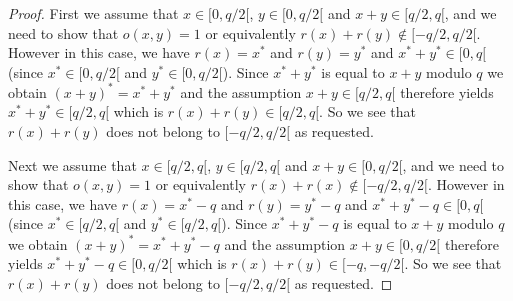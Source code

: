 \documentclass{article}
\begin{document}
\begin{proof}
  First we assume that $x\in[0,q/2[$, $y\in[0,q/2[$ and $x+y\in[q/2,q[$, and 
  we need to show that $o(x,y)=1$ or equivalently $r(x)+r(y)\not\in[-q/2,q/2[$.
  However in this case, we have $r(x)=x^{*}$ and $r(y)=y^{*}$ and 
  $x^{*}+y^{*}\in[0,q[$ (since $x^{*}\in[0,q/2[$ and $y^{*}\in[0,q/2[$).
  Since $x^{*}+y^{*}$ is equal to $x+y$ modulo $q$ we obtain
  $(x+y)^{*}=x^{*}+y^{*}$ and the assumption $x+y\in[q/2,q[$ therefore
  yields $x^{*}+y^{*}\in[q/2,q[$ which is $r(x)+r(y)\in[q/2,q[$. So we see
  that $r(x)+r(y)$ does not belong to $[-q/2,q/2[$ as requested.

  Next we assume that $x\in[q/2,q[$, $y\in[q/2,q[$ and $x+y\in[0,q/2[$,
  and we need to show that $o(x,y)=1$ or equivalently 
  $r(x)+r(x)\not\in[-q/2,q/2[$. However in this case, we have $r(x)=x^{*}-q$
  and $r(y)=y^{*}-q$ and $x^{*}+y^{*}-q\in[0,q[$ (since $x^{*}\in[q/2,q[$
  and $y^{*}\in[q/2,q[$). Since $x^{*}+y^{*}-q$ is equal to $x+y$ modulo $q$
  we obtain $(x+y)^{*}=x^{*}+y^{*}-q$ and the assumption $x+y\in[0,q/2[$
  therefore yields $x^{*}+y^{*}-q\in[0,q/2[$ which is $r(x)+r(y)\in[-q,-q/2[$.
  So we see that $r(x)+r(y)$ does not belong to $[-q/2,q/2[$ as requested.


\end{proof}
\end{document}
